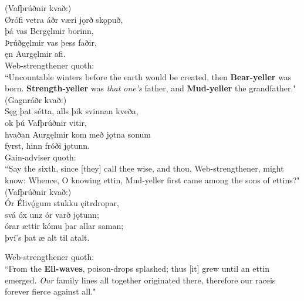 (Vafþrúðnir kvað:) \\%
\bva Ørófi vetra \hld áðr væri jǫrð skǫpuð, \\%
þá vas Bergęlmir borinn, \\%
Þrúðgęlmir \hld vas þess faðir, \\%
ęn Aurgęlmir afi.\\%

\bvb Web-strengthener quoth: \\ “Uncountable winters before the earth would be created, then \textbf{Bear-yeller} was born. \textbf{Strength-yeller} was \emph{that one's} father, and \textbf{Mud-yeller} the grandfather." \\

(Gagnráðr kvað:) \\%
\bva Sęg þat sétta, \hld alls þik svinnan kveða, \\%
ok þú Vafþrúðnir vitir, \\%
hvaðan Aurgęlmir kom \hld með jǫtna sonum \\%
fyrst, hinn fróði jǫtunn.\\%

\bvb Gain-adviser quoth: \\ “Say the sixth, since [they] call thee wise, and thou, Web-strengthener, might know: Whence, O knowing ettin, Mud-yeller first came among the sons of ettins?" \\

(Vafþrúðnir kvað:) \\%
\bva Ór Élivǫ́gum \hld stukku ęitrdropar, \\%
svá óx unz ór varð jǫtunn; \\%
órar ættir \hld kómu þar allar saman; \\%
því's þat æ alt til atalt.\footnotemark[20]\\%

\bvb Web-strengthener quoth: \\ “From the \textbf{Ell-waves}, poison-drops splashed; thus [it] grew until an ettin emerged. \emph{Our} family lines all together originated there, therefore our race\footnotemark[45] is forever fierce against all.\footnotemark[46]" \\

